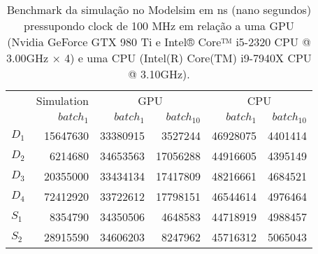\begin{table}[ht!]
\centering
\caption{Benchmark da simulação no Modelsim em ns (nano segundos) pressupondo clock de 100 MHz em relação a uma GPU (Nvidia GeForce GTX 980 Ti e Intel® Core™ i5-2320 CPU @ 3.00GHz × 4) e uma CPU (Intel(R) Core(TM) i9-7940X CPU @ 3.10GHz).}
\label{tab:5-dnn-benchmark}
\begin{tabular}{lrrrrr}
\toprule
 & Simulation & \multicolumn{2}{c}{GPU} & \multicolumn{2}{c}{CPU} \\
\cmidrule(r){1} \cmidrule(lr){2-3} \cmidrule(l){4-5}
 & $batch_{1}$ & $batch_{1}$ & $batch_{10}$ & $batch_{1}$ & $batch_{10}$ \\
\midrule
$D_1$ & 15647630 & 33380915 & 3527244 & 46928075 & 4401414 \\
$D_2$ & 6214680 & 34653563 & 17056288 & 44916605 & 4395149 \\
$D_3$ & 20355000 & 33434134 & 17417809 & 48216661 & 4684521 \\
$D_4$ & 72412920 & 33722612 & 17798151 & 46544614 & 4976464 \\
$S_1$ & 8354790 & 34350506 & 4648583 & 44718919 & 4988457 \\
$S_2$ & 28915590 & 34606203 & 8247962 & 45716312 & 5065043 \\
\bottomrule
\end{tabular}
\end{table}